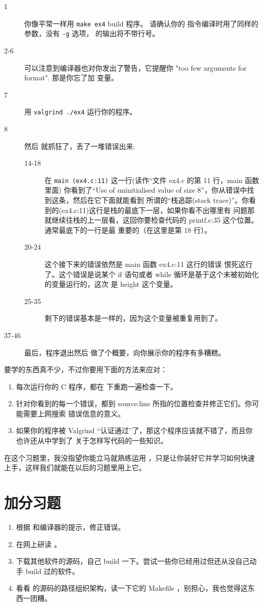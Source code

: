 \begin{description}
\item[1] 你像平常一样用 \verb|make ex4| build 程序。 请确认你的  指令编译时用了同样的参数，没有 \verb|-g| 选项， 的输出将不带行号。
\item[2-6] 可以注意到编译器也对你发出了警告，它提醒你 "too few arguments for format". 那是你忘了加  变量。
\item[7] 用 \verb|valgrind ./ex4| 运行你的程序。
\item[8] 然后  就抓狂了，丢了一堆错误出来:
    \begin{description}
        \item[14-18] 在 \verb|main (ex4.c:11)| 这一行(读作“文件 ex4.c 的第 11 行，main 函数里面)
            你看到了“Use of uninitialised value of size 8”，你从错误中找到这条，然后在它下面就能看到
            所谓的“栈追踪(stack trace)”。你看到的(ex4.c:11)这行是栈的最底下一层，如果你看不出哪里有
            问题那就继续往栈的上一层看，这回你要检查代码的 printf.c:35 这个位置。通常最底下的一行是最
            重要的（在这里是第 18 行）。
        \item[20-24] 这个接下来的错误依然是 main 函数 ex4.c:11 这行的错误 
            恨死这行了。这个错误是说某个 if 语句或者 while 循环是基于这个未被初始化的变量运行的，这次
            是 height 这个变量。
        \item[25-35] 剩下的错误基本是一样的，因为这个变量被重复用到了。
    \end{description}
\item[37-46] 最后，程序退出然后  做了个概要，向你展示你的程序有多糟糕。
\end{description}

要学的东西真不少，不过你要用下面的方法来应对：

\begin{enumerate}
\item 每次运行你的 C 程序，都在  下重跑一遍检查一下。
\item 针对你看到的每一个错误，都到 source:line 所指的位置检查并修正它们。你可能需要上网搜索
    错误信息的意义。
\item 如果你的程序被 Valgrind “认证通过”了，那这个程序应该就不错了，而且你也许还从中学到了
    关于怎样写代码的一些知识。
\end{enumerate}

在这个习题里，我没指望你能立马就熟练运用  ，只是让你装好它并学习如何快速上手，这样我们就能在以后的习题里用上它。

\section{加分习题}

\begin{enumerate}
\item 根据  和编译器的提示，修正错误。
\item 在网上研读  。
\item 下载其他软件的源码，自己 build 一下。尝试一些你已经用过但还从没自己动手 build 过的软件。
\item 看看  的源码的路径组织架构，读一下它的 Makefile ，别担心，我也觉得这东西一团糟。
\end{enumerate}

